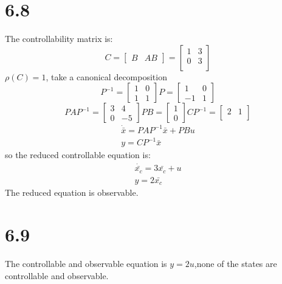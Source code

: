\documentclass{article}
\begin{document}
\section*{6.8}
The controllability matrix is:\\
\[
    C=
    \left[
    \begin{array}{cc}
    B & AB
    \end{array}
    \right]   
    =
    \left[
        \begin{array}{cc}
        1 & 3\\
        0 & 3\\
        \end{array}
    \right]  
\]
$\rho(C)=1$, take a canonical decomposition
\[
P^{-1}=
\left[
    \begin{array}{cc}
        1 & 0\\
        1 & 1
    \end{array}
\right]
P=
\left[
    \begin{array}{cc}
        1 & 0\\
        -1 & 1
    \end{array}
\right]
\]
\[
PAP^{-1}=
\left[
    \begin{array}{cc}
        3 & 4\\
        0 & -5
    \end{array}
\right]
PB=
\left[
    \begin{array}{c}
        1\\
        0 
    \end{array}
\right]
CP^{-1}=
\left[
    \begin{array}{cc}
        2 & 1\\
    \end{array}
\right]
\]
\[
\begin{split}
\dot{\bar{x}}=PAP^{-1}\bar{x}+PBu\\
y=CP^{-1}\bar{x}
\end{split}   
\]
so the reduced controllable equation is:
\[
\begin{split}
    \dot{\bar{x_c}}=3\bar{x_c}+u\\
    y=2\bar{x_c}
\end{split}
\]
The reduced equation is observable.

\section*{6.9}
The controllable and observable equation is $y=2u$,none of the states are controllable and observable.
\end{document}
